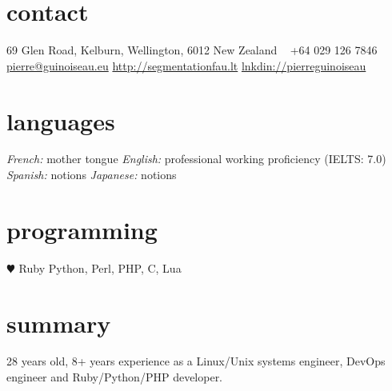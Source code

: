\documentclass[]{friggeri-cv} %
\begin{document}



\begin{aside} %
\section{contact}
69 Glen Road,
Kelburn,
Wellington, 6012
New Zealand
~
+64 029 126 7846
~
\href{mailto:pierre@guinoiseau.eu}{pierre@guinoiseau.eu}
\href{http://segmentationfau.lt}{http://segmentationfau.lt}
\href{http://linkedin.com/in/pierreguinoiseau}{lnkdin://pierreguinoiseau}
\section{languages}
\textit{French:} mother tongue
\textit{English:} professional working proficiency (IELTS: 7.0)
\textit{Spanish:} notions
\textit{Japanese:} notions
\section{programming}
{\color{red} $\varheartsuit$} Ruby
Python, Perl, PHP, C, Lua
\end{aside}


\section{summary}

28 years old, 8+ years experience as a Linux/Unix systems engineer, DevOps engineer and Ruby/Python/PHP developer. \\

\end{document}
